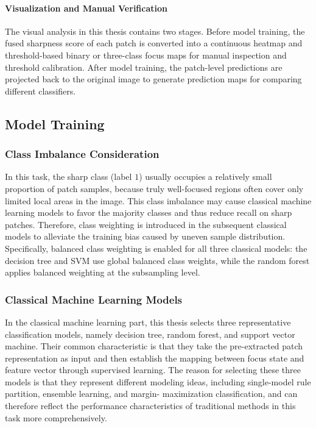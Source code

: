 \paragraph{Visualization and Manual Verification}
\par The visual analysis in this thesis contains two stages. Before model
training, the fused sharpness score of each patch is converted into a continuous
heatmap and threshold-based binary or three-class focus maps for manual
inspection and threshold calibration. After model training, the patch-level
predictions are projected back to the original image to generate prediction maps
for comparing different classifiers.

\subsection{Model Training}
\subsubsection{Class Imbalance Consideration}
\par In this task, the sharp class (label $1$) usually occupies a relatively
small proportion of patch samples, because truly well-focused regions often
cover only limited local areas in the image. This class imbalance may cause
classical machine learning models to favor the majority classes and thus reduce
recall on sharp patches. Therefore, class weighting is introduced in the
subsequent classical models to alleviate the training bias caused by uneven
sample distribution. Specifically, balanced class weighting is enabled for all
three classical models: the decision tree and SVM use global balanced class
weights, while the random forest applies balanced weighting at the subsampling
level.

\subsubsection{Classical Machine Learning Models}
\par In the classical machine learning part, this thesis selects three
representative classification models, namely decision tree, random forest, and
support vector machine. Their common characteristic is that they take the
pre-extracted patch representation as input and then establish the mapping
between focus state and feature vector through supervised learning. The reason
for selecting these three models is that they represent different modeling
ideas, including single-model rule partition, ensemble learning, and margin-
maximization classification, and can therefore reflect the performance
characteristics of traditional methods in this task more comprehensively.


